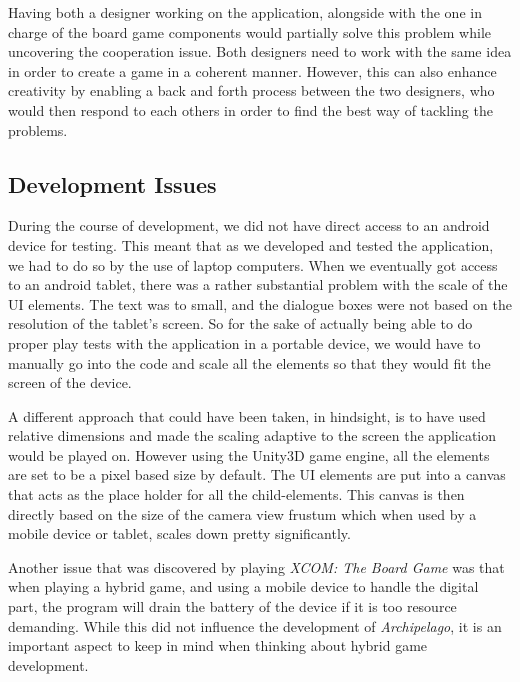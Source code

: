 Having both a designer working on the application, alongside with the one in charge of the board game components would partially solve this problem while uncovering the cooperation issue. Both designers need to work with the same idea in order to create a game in a coherent manner. However, this can also enhance creativity by enabling a back and forth process between the two designers, who would then respond to each others in order to find the best way of tackling the problems. 

\subsection{Development Issues}
During the course of development, we did not have direct access to an android device for testing. This meant that as we developed and tested the application, we had to do so by the use of laptop computers. When we eventually got access to an android tablet, there was a rather substantial problem with the scale of the UI elements. The text was to small, and the dialogue boxes were not based on the resolution of the tablet's screen. So for the sake of actually being able to do proper play tests with the application in a portable device, we would have to manually go into the code and scale all the elements so that they would fit the screen of the device. 

A different approach that could have been taken, in hindsight, is to have used relative dimensions and made the scaling adaptive to the screen the application would be played on. However using the Unity3D game engine, all the elements are set to be a pixel based size by default. The UI elements are put into a canvas that acts as the place holder for all the child-elements. This canvas is then directly based on the size of the camera view frustum which when used by a mobile device or tablet, scales down pretty significantly. 

Another issue that was discovered by playing \textit{XCOM: The Board Game} \cite{game:xcomtbg} was that when playing a hybrid game, and using a mobile device to handle the digital part, the program will drain the battery of the device if it is too resource demanding. While this did not influence the development of \textit{Archipelago}, it is an important aspect to keep in mind when thinking about hybrid game development.
